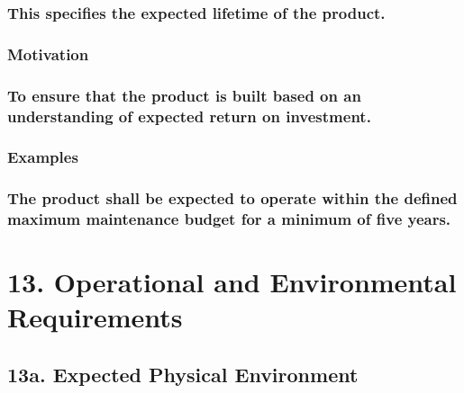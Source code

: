 \documentclass[
]{article}
\begin{document}
\hypertarget{this-specifies-the-expected-lifetime-of-the-product.}{%
\subsubsection{This specifies the expected lifetime of the
product.}\label{this-specifies-the-expected-lifetime-of-the-product.}}

\hypertarget{motivation-43}{%
\subsubsection{Motivation}\label{motivation-43}}

\hypertarget{to-ensure-that-the-product-is-built-based-on-an-understanding-of-expected-return-on-investment.}{%
\subsubsection{To ensure that the product is built based on an
understanding of expected return on
investment.}\label{to-ensure-that-the-product-is-built-based-on-an-understanding-of-expected-return-on-investment.}}

\hypertarget{examples-28}{%
\subsubsection{Examples}\label{examples-28}}

\hypertarget{the-product-shall-be-expected-to-operate-within-the-defined-maximum-maintenance-budget-for-a-minimum-of-five-years.}{%
\subsubsection{The product shall be expected to operate within the
defined maximum maintenance budget for a minimum of five
years.}\label{the-product-shall-be-expected-to-operate-within-the-defined-maximum-maintenance-budget-for-a-minimum-of-five-years.}}

\hypertarget{operational-and-environmental-requirements}{%
\section{13. Operational and Environmental
Requirements}\label{operational-and-environmental-requirements}}

\hypertarget{a.-expected-physical-environment}{%
\subsection{13a. Expected Physical
Environment}\label{a.-expected-physical-environment}}
\end{document}
